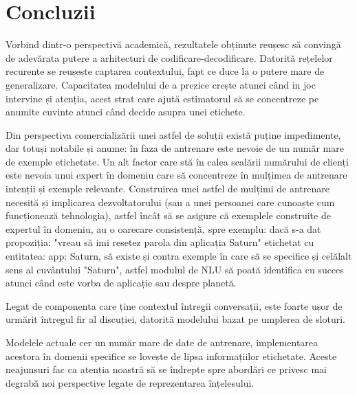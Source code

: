 \chapter{Concluzii}

Vorbind dintr-o perspectivă academică, rezultatele obținute reușesc să convingă de adevărata putere a arhitecturi de codificare-decodificare.
Datorită rețelelor recurente se reușește captarea contextului, fapt ce duce la o putere mare de generalizare. Capacitatea modelului de a prezice crește atunci când in joc intervine și atenția, acest strat care ajută estimatorul să se concentreze pe anumite cuvinte atunci când decide asupra unei etichete.

Din perspectiva comercializării unei astfel de soluții există puține impedimente, dar totuși notabile și anume: în faza de antrenare este nevoie de un număr mare de exemple etichetate. Un alt factor care stă în calea scalării numărului de clienți este nevoia unui expert în domeniu care să concentreze în mulțimea de antrenare intenții și exemple relevante. Construirea unei astfel de mulțimi de antrenare necesită și implicarea dezvoltatorului (sau a unei persoanei care cunoaște cum funcționează tehnologia), astfel încât să se asigure că exemplele construite de expertul în domeniu, au o oarecare consistență, spre exemplu: dacă s-a dat propoziția: "vreau să imi resetez parola din aplicația Saturn" etichetat cu entitatea: app: Saturn, să existe și contra exemple în care să se specifice și celălalt sens al cuvântului "Saturn", astfel modulul de NLU să poată identifica cu succes atunci când este vorba de aplicație sau despre planetă.

Legat de componenta care ține contextul întregii conversații, este foarte ușor de urmărit întregul fir al discuției, datorită modelului bazat pe umplerea de sloturi.

Modelele actuale cer un număr mare de date de antrenare, implementarea acestora în domenii specifice se lovește de lipsa informațiilor etichetate. Aceste neajunsuri fac ca atenția noastră să se îndrepte spre abordări ce privesc mai degrabă noi perspective legate de reprezentarea înțelesului.